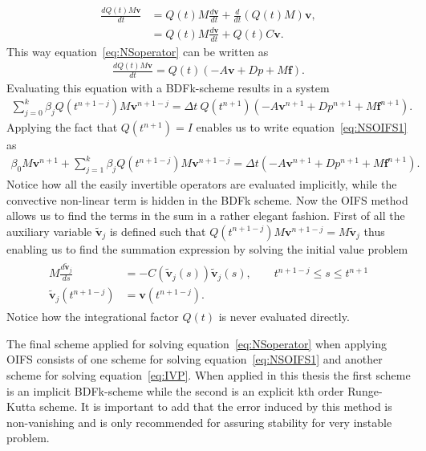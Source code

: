 \begin{align}
    \frac{dQ(t)M\mathbf{v}}{dt} &=  Q(t)M\frac{d\mathbf{v}}{dt} + \frac{d}{dt}(Q(t)M)\mathbf{v},\\
    &= Q(t)M\frac{d\mathbf{v}}{dt} + Q(t)C\mathbf{v}. 
    \label{eq:integrationalfactor}
\end{align}
%
This way equation~\ref{eq:NSoperator} can be written as 
\begin{align}
    \frac{d Q(t)M\mathbf{v}}{dt} =Q(t)( -A\mathbf{v} +D p +M\mathbf{f}).
    \label{eq:NSoperatorOIFS}
\end{align}
Evaluating this equation with a BDFk-scheme results in a system 
\begin{align}
    \sum_{j=0}^{k}\beta_jQ(t^{n+1-j})M\mathbf{v}^{n+1-j} =\Delta t \: Q(t^{n+1})( -A\mathbf{v}^{n+1} +D p^{n+1} +M\mathbf{f}^{n+1}).
    \label{eq:NSOIFS1}
\end{align}
Applying the fact that $Q(t^{n+1}) = I$ enables us to write equation~\ref{eq:NSOIFS1} as 
\begin{align}
    \beta_0M\mathbf{v}^{n+1} + \sum_{j=1}^{k}\beta_jQ(t^{n+1-j})M\mathbf{v}^{n+1-j} 
    =\Delta t ( -A\mathbf{v}^{n+1} +D p^{n+1} +M\mathbf{f}^{n+1}).
    \label{eq:NSOIFS1}
\end{align}
Notice how all the easily invertible operators are evaluated implicitly, while the convective non-linear term is hidden in the BDFk scheme. 
Now the OIFS method allows us to find the terms in the sum in a rather elegant fashion.  
First of all the auxiliary variable $\tilde{\mathbf{v}}_j$ is defined such that $Q(t^{n+1-j})M\mathbf{v}^{n+1-j} = M\tilde{\mathbf{v}}_j$ thus enabling us to find
the summation expression by solving the initial value problem 
\begin{align}
    \begin{split}
    M\frac{d\tilde{\mathbf{v}}_j}{ds} &= -C(\tilde{\mathbf{v}}_j(s))\tilde{\mathbf{v}}_j(s) , \qquad t^{n+1-j}\leq s\leq t^{n+1}\\
    \tilde{\mathbf{v}}_j(t^{n+1-j}) &= \mathbf{v}(t^{n+1-j}).
    \end{split}
    \label{eq:IVP}
\end{align}
Notice how the integrational factor $Q(t)$ is never evaluated directly.

The final scheme applied for solving equation~\ref{eq:NSoperator} when applying OIFS consists of one scheme for solving 
equation~\ref{eq:NSOIFS1} and another scheme for solving equation~\ref{eq:IVP}. When applied in this thesis the 
first scheme is an implicit BDFk-scheme while the second is an explicit kth order Runge-Kutta scheme. 
It is important to add that the error induced by this method is non-vanishing and is only recommended for assuring stability 
for very instable problem. 

